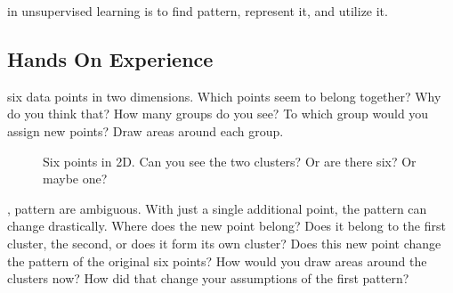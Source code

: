  in unsupervised learning is to find pattern, represent it, and utilize it.







\subsection{Hands On Experience}

 six data points in two dimensions. Which points seem to belong together? 
Why do you think that? How many groups do you see? To which group would you assign new points?
Draw areas around each group. 

\begin{figure}
\centering
{}
\caption{Six points in 2D. Can you see the two clusters? Or are there six? Or maybe one?}
\label{fig:six_points}
\end{figure}



, pattern are ambiguous. With just a single additional point, the pattern can change drastically.
Where does the new point belong? Does it belong to the first cluster, the second, or does it form its own cluster?
Does this new point change the pattern of the original six points? How would you draw areas around the clusters now? 
How did that change your assumptions of the first pattern? 

